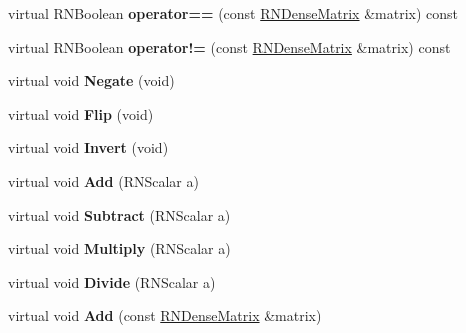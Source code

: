 \begin{DoxyCompactItemize}
\item 
virtual R\+N\+Boolean {\bfseries operator==} (const \hyperlink{class_r_n_dense_matrix}{R\+N\+Dense\+Matrix} \&matrix) const \hypertarget{class_r_n_dense_matrix_a2da6507695ba28cf36180bc8a710e4ac}{}\label{class_r_n_dense_matrix_a2da6507695ba28cf36180bc8a710e4ac}

\item 
virtual R\+N\+Boolean {\bfseries operator!=} (const \hyperlink{class_r_n_dense_matrix}{R\+N\+Dense\+Matrix} \&matrix) const \hypertarget{class_r_n_dense_matrix_af7797f94b2293a38335aef1a22c77833}{}\label{class_r_n_dense_matrix_af7797f94b2293a38335aef1a22c77833}

\item 
virtual void {\bfseries Negate} (void)\hypertarget{class_r_n_dense_matrix_a986481f5e6b9fd4abc0c3aa1c04d2ebd}{}\label{class_r_n_dense_matrix_a986481f5e6b9fd4abc0c3aa1c04d2ebd}

\item 
virtual void {\bfseries Flip} (void)\hypertarget{class_r_n_dense_matrix_a0549b18d3d9d1dbc8448d3a5757c7ffc}{}\label{class_r_n_dense_matrix_a0549b18d3d9d1dbc8448d3a5757c7ffc}

\item 
virtual void {\bfseries Invert} (void)\hypertarget{class_r_n_dense_matrix_ab22f2cb4765693506c56e7a63f8bda6e}{}\label{class_r_n_dense_matrix_ab22f2cb4765693506c56e7a63f8bda6e}

\item 
virtual void {\bfseries Add} (R\+N\+Scalar a)\hypertarget{class_r_n_dense_matrix_adb741bd2935d7c1f09005aa71837305a}{}\label{class_r_n_dense_matrix_adb741bd2935d7c1f09005aa71837305a}

\item 
virtual void {\bfseries Subtract} (R\+N\+Scalar a)\hypertarget{class_r_n_dense_matrix_acb7dac25bed4c2cc702e1816a322a85f}{}\label{class_r_n_dense_matrix_acb7dac25bed4c2cc702e1816a322a85f}

\item 
virtual void {\bfseries Multiply} (R\+N\+Scalar a)\hypertarget{class_r_n_dense_matrix_a3b5255cffd88db28b473b529de057630}{}\label{class_r_n_dense_matrix_a3b5255cffd88db28b473b529de057630}

\item 
virtual void {\bfseries Divide} (R\+N\+Scalar a)\hypertarget{class_r_n_dense_matrix_a627bbc9a70c37fb061be67b04140353d}{}\label{class_r_n_dense_matrix_a627bbc9a70c37fb061be67b04140353d}

\item 
virtual void {\bfseries Add} (const \hyperlink{class_r_n_dense_matrix}{R\+N\+Dense\+Matrix} \&matrix)\hypertarget{class_r_n_dense_matrix_a15fc36b7741db0f004087c940140fa99}{}\label{class_r_n_dense_matrix_a15fc36b7741db0f004087c940140fa99}


\end{DoxyCompactItemize}
